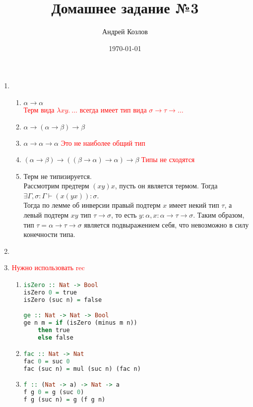 \documentclass[12pt,a4paper]{article}
\begin{document}
\title{Домашнее задание №3}
\author{Андрей Козлов}
\date{\today}

\maketitle

\begin{enumerate}
\item {
	\begin{enumerate}
		\item $\alpha \rightarrow \alpha$ \\
            \textcolor{red}{Терм вида $\lambda x y.\ \ldots$ всегда имеет тип вида $\sigma \to \tau \to \ldots$}
		\item $\alpha \rightarrow (\alpha \rightarrow \beta) \rightarrow \beta$
		\item $\alpha \rightarrow \alpha \rightarrow \alpha$
            \textcolor{red}{Это не наиболее общий тип}
		\item $(\alpha \rightarrow \beta) \rightarrow ((\beta \rightarrow \alpha) \rightarrow \alpha) \rightarrow \beta$
            \textcolor{red}{Типы не сходятся}
		\item {
			Терм не типизируется.\\
			Рассмотрим предтерм $(x y) x$, пусть он является термом. Тогда $\exists \Gamma, \sigma \colon \Gamma \vdash (x (y x)) \colon \sigma$.\\
			Тогда по лемме об инверсии правый подтерм $x$ имеет некий тип $\tau$, а левый подтерм $x y$ тип $\tau \rightarrow \sigma$, то есть $y \colon \alpha, x \colon \alpha \rightarrow \tau \rightarrow \sigma$. Таким образом, тип $\tau =  \alpha \rightarrow \tau \rightarrow \sigma$ является подвыражением себя, что невозможно в силу конечности типа.
		}
	\end{enumerate}
}
\item
\item
\textcolor{red}{Нужно использовать rec}
{
	\begin{enumerate}
		\item {
			\begin{lstlisting}[language=Haskell]
isZero :: Nat -> Bool
isZero 0 = true
isZero (suc n) = false

ge :: Nat -> Nat -> Bool
ge n m = if (isZero (minus m n))
	then true
	else false
			\end{lstlisting}
		}
		\item {
			\begin{lstlisting}[language=Haskell]
fac :: Nat -> Nat
fac 0 = suc 0
fac (suc n) = mul (suc n) (fac n)
			\end{lstlisting}
		}
		\item {
			\begin{lstlisting}[language=Haskell]
f :: (Nat -> a) -> Nat -> a
f g 0 = g (suc 0)
f g (suc n) = g (f g n)


\end{lstlisting}}
\end{enumerate}}
\end{enumerate}
\end{document}
